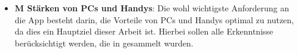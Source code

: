 \begin{itemize}
	\item \textbf{M Stärken von PCs und Handys}: %
		Die wohl wichtigste Anforderung an die App besteht darin, die Vorteile von PCs und Handys optimal zu nutzen, da dies ein Hauptziel dieser Arbeit ist. Hierbei sollen alle Erkenntnisse berücksichtigt werden, die in  gesammelt wurden.



\end{itemize}
